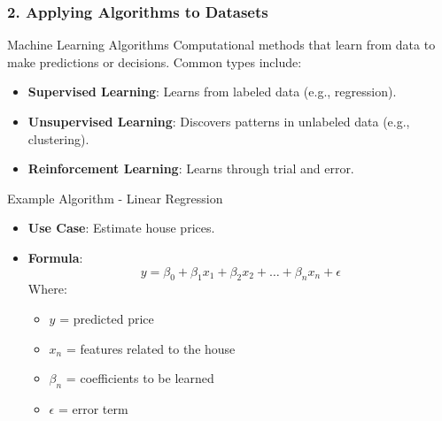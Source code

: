 \documentclass{beamer}
\begin{document}
\begin{frame}
    \frametitle{2. Applying Algorithms to Datasets}
    \begin{block}{Machine Learning Algorithms}
        Computational methods that learn from data to make predictions or decisions. Common types include:
    \end{block}
    
    \begin{itemize}
        \item \textbf{Supervised Learning}: Learns from labeled data (e.g., regression).
        \item \textbf{Unsupervised Learning}: Discovers patterns in unlabeled data (e.g., clustering).
        \item \textbf{Reinforcement Learning}: Learns through trial and error.
    \end{itemize}
    
    \begin{block}{Example Algorithm - Linear Regression}
        \begin{itemize}
            \item \textbf{Use Case}: Estimate house prices.
            \item \textbf{Formula}:
            \begin{equation}
            y = \beta_0 + \beta_1 x_1 + \beta_2 x_2 + \ldots + \beta_n x_n + \epsilon
            \end{equation}
            Where:
            \begin{itemize}
                \item $y$ = predicted price
                \item $x_n$ = features related to the house
                \item $\beta_n$ = coefficients to be learned
                \item $\epsilon$ = error term
            \end{itemize}
        \end{itemize}
    \end{block}
\end{frame}
\end{document}
